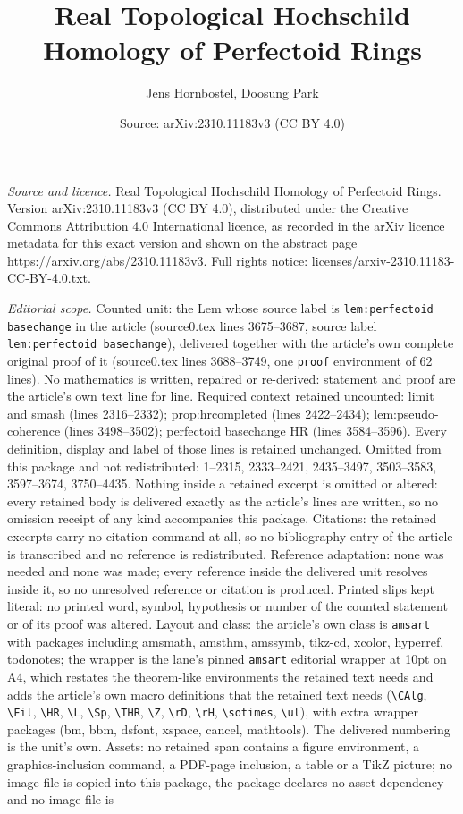 \documentclass[10pt,a4paper]{amsart}
\title[Real Topological Hochschild Homology of Perfectoid Rings]{Real Topological Hochschild Homology of Perfectoid Rings}
\author{Jens Hornbostel, Doosung Park}
\date{Source: arXiv:2310.11183v3 (CC BY 4.0)}
\begin{document}
\maketitle

\noindent\emph{Source and licence.} Real Topological Hochschild Homology of Perfectoid Rings. Version arXiv:2310.11183v3 (CC BY 4.0), distributed under the Creative Commons Attribution 4.0 International licence, as recorded in the arXiv licence metadata for this exact version and shown on the abstract page https://arxiv.org/abs/2310.11183v3. Full rights notice: licenses/arxiv-2310.11183-CC-BY-4.0.txt.\par\smallskip

\noindent\textit{Editorial scope.} Counted unit: the Lem whose source label is \texttt{lem:perfectoid basechange} in the article (source0.tex lines 3675--3687, source label \texttt{lem:perfectoid basechange}), delivered together with the article's own complete original proof of it (source0.tex lines 3688--3749, one \texttt{proof} environment of 62 lines). No mathematics is written, repaired or re-derived: statement and proof are the article's own text line for line. Required context retained uncounted: limit and smash (lines 2316--2332); prop:hrcompleted (lines 2422--2434); lem:pseudo-coherence (lines 3498--3502); perfectoid basechange HR (lines 3584--3596). Every definition, display and label of those lines is retained unchanged. Omitted from this package and not redistributed: 1--2315, 2333--2421, 2435--3497, 3503--3583, 3597--3674, 3750--4435. Nothing inside a retained excerpt is omitted or altered: every retained body is delivered exactly as the article's lines are written, so no omission receipt of any kind accompanies this package. Citations: the retained excerpts carry no citation command at all, so no bibliography entry of the article is transcribed and no reference is redistributed. Reference adaptation: none was needed and none was made; every reference inside the delivered unit resolves inside it, so no unresolved reference or citation is produced. Printed slips kept literal: no printed word, symbol, hypothesis or number of the counted statement or of its proof was altered. Layout and class: the article's own class is \texttt{amsart} with packages including amsmath, amsthm, amssymb, tikz-cd, xcolor, hyperref, todonotes; the wrapper is the lane's pinned \texttt{amsart} editorial wrapper at 10pt on A4, which restates the theorem-like environments the retained text needs and adds the article's own macro definitions that the retained text needs (\texttt{\textbackslash CAlg}, \texttt{\textbackslash Fil}, \texttt{\textbackslash HR}, \texttt{\textbackslash L}, \texttt{\textbackslash Sp}, \texttt{\textbackslash THR}, \texttt{\textbackslash Z}, \texttt{\textbackslash rD}, \texttt{\textbackslash rH}, \texttt{\textbackslash sotimes}, \texttt{\textbackslash ul}), with extra wrapper packages (bm, bbm, dsfont, xspace, cancel, mathtools). The delivered numbering is the unit's own. Assets: no retained span contains a figure environment, a graphics-inclusion command, a PDF-page inclusion, a table or a TikZ picture; no image file is copied into this package, the package declares no asset dependency and no image file is 
\end{document}
